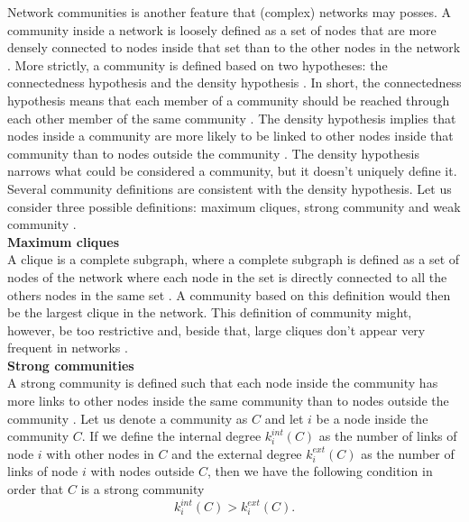 \documentclass[11 pt , letterpaper , twoside , openright]{book}
\begin{document}
Network communities is another feature that (complex) networks may posses. A community inside a network is loosely defined as a set of nodes that are more densely connected to nodes inside that set than to the other nodes in the network \cite{Saha2015}. More strictly, a community is defined based on two hypotheses: the connectedness hypothesis and the density hypothesis \cite{Albert2016}. In short, the connectedness hypothesis means that each member of a community should be reached through each other member of the same community \cite{Albert2016}. The density hypothesis implies that nodes inside a community are more likely to be linked to other nodes inside that community than to nodes outside the community \cite{Albert2016}. The density hypothesis narrows what could be considered a community, but it doesn't uniquely define it. Several community definitions are consistent with the density hypothesis. Let us consider three possible definitions: maximum cliques, strong community and weak community \cite{Albert2016}.\\
\newline
\textbf{Maximum cliques}\\
\newline
A clique is a complete subgraph, where a complete subgraph is defined as a set of nodes of the network where each node in the set is directly connected to all the others nodes in the same set \cite{Albert2016}. A community based on this definition would then be the largest clique in the network. This definition of community might, however, be too restrictive and, beside that, large cliques don't appear very frequent in networks \cite{Albert2016}.\\   
\newline
\textbf{Strong communities}\\
\newline
A strong community is defined such that each node inside the community has more links to other nodes inside the same community than to nodes outside the community \cite{Albert2016}. Let us denote a community as $C$ and let $i$ be a node inside the community $C$. If we define the internal degree $k_i^{int}(C)$ as the number of links of node $i$ with other nodes in $C$ and the external degree $k_i^{ext}(C)$ as the number of links of node $i$ with nodes outside $C$, then we have the following condition in order that $C$ is a strong community \cite{Albert2016}
\begin{equation}
	k_i^{int}(C) > k_i^{ext}(C).
\end{equation}
\end{document}
